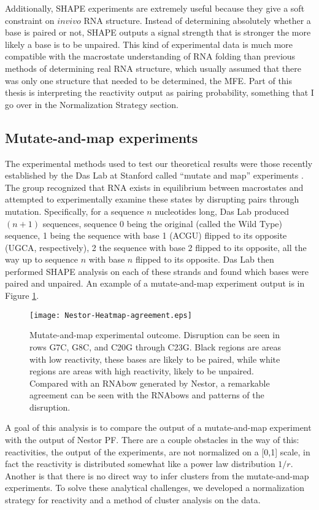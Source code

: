 Additionally, SHAPE experiments are extremely useful because they give
a soft constraint on $in vivo$ RNA structure. Instead of determining
absolutely whether a base is paired or not, SHAPE outputs a signal
strength that is stronger the more likely a base is to be
unpaired. This kind of experimental data is much more compatible with
the macrostate understanding of RNA folding than previous methods of
determining real RNA structure, which usually assumed that there was
only one structure that needed to be determined, the MFE. Part of this
thesis is interpreting the reactivity output as pairing probability,
something that I go over in the Normalization Strategy section. 

\subsection{Mutate-and-map experiments}

The experimental methods used to test our theoretical results were
those recently established by the Das Lab at Stanford called ``mutate
and map'' experiments \cite{kladwang2011two}. The group recognized
that RNA exists in equilibrium between macrostates and attempted to
experimentally examine these states by disrupting pairs through
mutation. Specifically, for a sequence $n$ nucleotides long, Das Lab
produced $(n+1)$ sequences, sequence 0 being the original (called the
Wild Type) sequence, 1 being the sequence with base 1 (ACGU) flipped
to its opposite (UGCA, respectively), 2 the sequence with base 2
flipped to its opposite, all the way up to sequence $n$ with base
$n$ flipped to its opposite. Das Lab then performed SHAPE
analysis on each of these strands and found which bases were paired
and unpaired. An example of a mutate-and-map experiment output is in
Figure \ref{fig:heatmap}.
\begin{figure}[t]
\texttt{[image: Nestor-Heatmap-agreement.eps]}
\caption[Mutate-and-Map Heatmap]{Mutate-and-map experimental
  outcome. Disruption can be seen in rows G7C, G8C, and C20G through
  C23G. Black regions are areas with low reactivity, these bases are
  likely to be paired, while white regions are areas with high
  reactivity, likely to be unpaired. Compared with an RNAbow generated
  by Nestor, a remarkable agreement can be seen with the RNAbows and
  patterns of the disruption.}
\label{fig:heatmap}
\end{figure}

A goal of this analysis is to compare the output of a mutate-and-map
experiment with the output of Nestor PF. There are a couple obstacles
in the way of this: reactivities, the output of the experiments, are
not normalized on a [0,1] scale, in fact the reactivity is distributed
somewhat like a power law distribution $1/r$. Another is that there is
no direct way to infer clusters from the mutate-and-map
experiments. To solve these analytical challenges, we developed a
normalization strategy for reactivity and a method of cluster analysis
on the data.

